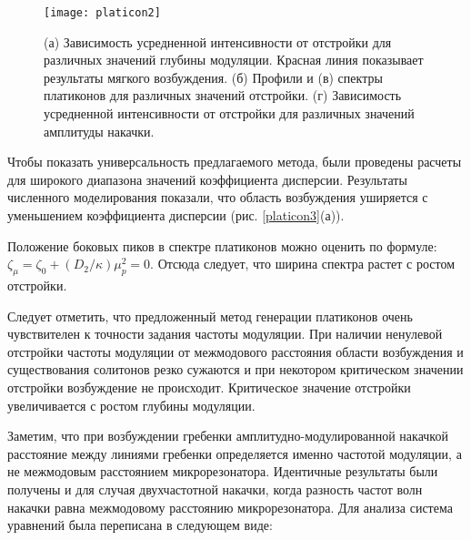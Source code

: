 \begin{figure}
  \centering
  \texttt{[image: platicon2]}
  \caption{(а) Зависимость усредненной интенсивности от отстройки для различных значений глубины модуляции. Красная линия показывает результаты мягкого возбуждения. (б) Профили и (в) спектры платиконов для различных значений отстройки. (г) Зависимость усредненной интенсивности от отстройки для различных значений амплитуды накачки.} \label{platicon2}
\end{figure}

Чтобы показать универсальность предлагаемого метода, были проведены расчеты для широкого диапазона значений коэффициента дисперсии. Результаты численного моделирования показали, что область возбуждения уширяется с уменьшением коэффициента дисперсии (рис. \ref{platicon3}(а)).


Положение боковых пиков в спектре платиконов можно оценить по формуле: $\zeta_\mu=\zeta_0+(D_2/\kappa)\mu^2_p=0$. Отсюда следует, что ширина спектра растет с ростом отстройки.

Следует отметить, что предложенный метод генерации платиконов очень чувствителен к точности задания частоты модуляции. При наличии ненулевой отстройки частоты модуляции от межмодового расстояния области возбуждения и существования солитонов резко сужаются и при некотором критическом значении отстройки возбуждение не происходит. Критическое значение отстройки увеличивается с ростом глубины модуляции.


Заметим, что при возбуждении гребенки амплитудно-модулированной накачкой расстояние между линиями гребенки определяется именно частотой модуляции, а не межмодовым расстоянием микрорезонатора.
Идентичные результаты были получены и для случая двухчастотной накачки, когда разность частот волн накачки равна межмодовому расстоянию микрорезонатора. Для анализа система уравнений была переписана в следующем виде:

